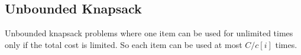 \documentclass[../main.tex]{subfiles}
\begin{document}











\subsection{Unbounded Knapsack}
\label{unbound_knapsack}
Unbounded knapsack problems where one item can be used for unlimited times only if the total cost is limited. So each item can be used at most $C/c[i]$ times. 


\end{document}
